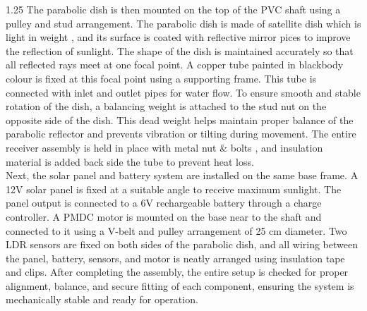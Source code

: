 \noindent
\begin{spacing}{1.25}
{\fontsize{10.2}{14.5}\selectfont
The parabolic dish is then mounted on the top of the PVC shaft using a pulley and stud arrangement. The parabolic dish is made of satellite dish which is light in weight , and its surface is coated with reflective mirror pices to improve the reflection of sunlight. The shape of the dish is maintained accurately so that all reflected rays meet at one focal point. A copper tube painted in blackbody colour is fixed at this focal point using a supporting frame. This tube is connected with inlet and outlet pipes for water flow. To ensure smooth and stable rotation of the dish, a balancing weight is attached to the stud nut on the opposite side of the dish. This dead weight helps maintain proper balance of the parabolic reflector and prevents vibration or tilting during movement. The entire receiver assembly is held in place with metal nut \& bolts , and insulation material is added back side the tube to prevent heat loss.\\[4mm]
Next, the solar panel and battery system are installed on the same base frame. A 12V solar panel is fixed at a suitable angle to receive maximum sunlight. The panel output is connected to a 6V rechargeable battery through a charge controller. A PMDC motor is mounted on the base near to the shaft and connected to it using a V-belt and pulley arrangement of 25 cm diameter. Two LDR sensors are fixed on both sides of the parabolic dish, and all wiring between the panel, battery, sensors, and motor is neatly arranged using insulation tape and clips. After completing the assembly, the entire setup is checked for proper alignment, balance, and secure fitting of each component, ensuring the system is mechanically stable and ready for operation.
}
\end{spacing}
\clearpage
